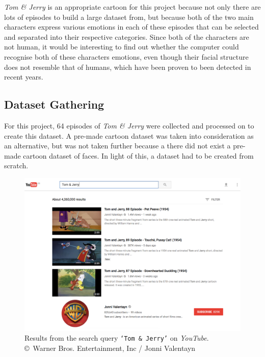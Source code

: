\documentclass[report, 11pt, oneside]{dissertation}
\begin{document}
\textit{Tom \& Jerry} is an appropriate cartoon for this project because not only there are lots of episodes to build a large dataset from, but because both of the two main characters express various emotions in each of these episodes that can be selected and separated into their respective categories. Since both of the characters are not human, it would be interesting to find out whether the computer could recognise both of these characters emotions, even though their facial structure does not resemble that of humans, which have been proven to been detected in recent years.

\subsection{Dataset Gathering}

For this project, 64 episodes of \textit{Tom \& Jerry} were collected and processed on to create this dataset. A pre-made cartoon dataset was taken into consideration as an alternative, but was not taken further because a there did not exist a pre-made cartoon dataset of faces. In light of this, a dataset had to be created from scratch. 

 \begin{figure}[!htb]
	\centering
	\includegraphics[scale=0.50]{figure_21.pdf}
	\caption[\textit{YouTube} results for the query \texttt{`Tom \& Jerry'}.]{Results from the search query \texttt{`Tom \& Jerry'} on \textit{YouTube}. \copyright \ Warner Bros. Entertainment, Inc / Jonni Valentayn }
	\label{fig:tom_and_jerry_dataset_gathering_1}
\end{figure}
\end{document}
